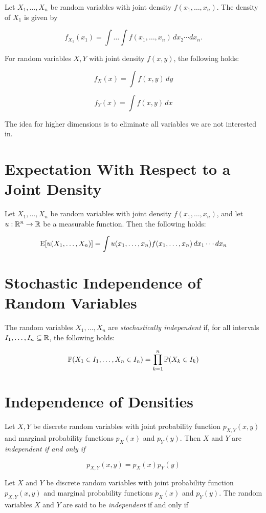 Let \( X_1, \ldots, X_n \) be random variables with joint density \( f(x_1, \ldots, x_n) \).
The density of \( X_1 \) is given by

\[
    f_{X_1}(x_1) = \int \dots \int  f(x_1, \ldots, x_n) \, dx_2 \cdots dx_n.
\]

For random variables \( X, Y \) with joint density \( f(x, y) \), the following holds:

\[
    f_X(x) = \int f(x, y) \, dy
\]

\[
    f_Y(x) = \int f(x, y) \, dx
\]

The idea for higher dimensions is to eliminate all variables we are not interested in.

\section{Expectation With Respect to a Joint Density}

Let \( X_1, \ldots, X_n \) be random variables with joint density \( f(x_1, \ldots, x_n) \),
and let \( u : \mathbb{R}^n \to \mathbb{R} \) be a measurable function. Then the following holds:

\[
    \mathrm{E}[u(X_1, \ldots, X_n)]
    = \int u(x_1, \ldots, x_n) f(x_1, \ldots, x_n) \, dx_1 \cdots dx_n
\]

\section{Stochastic Independence of Random Variables}

The random variables \( X_1, \ldots, X_n \) are \emph{stochastically independent} if,
for all intervals \( I_1, \ldots, I_n \subseteq \mathbb{R} \), the following holds:

\[
    \mathbb{P}(X_1 \in I_1, \ldots, X_n \in I_n)
    = \prod_{k=1}^{n} \mathbb{P}(X_k \in I_k)
\]

\section{Independence of Densities}

Let \( X, Y \) be discrete random variables with joint probability function \( p_{X,Y}(x, y) \)
and marginal probability functions \( p_X(x) \) and \( p_Y(y) \). Then \( X \) and \( Y \) are \emph{independent if and only if}

\[
    p_{X,Y}(x, y) = p_X(x) p_Y(y)
\]

Let \( X \) and \( Y \) be discrete random variables with joint probability function \( p_{X,Y}(x, y) \)
and marginal probability functions \( p_X(x) \) and \( p_Y(y) \).
The random variables \( X \) and \( Y \) are said to be \emph{independent} if and only if

